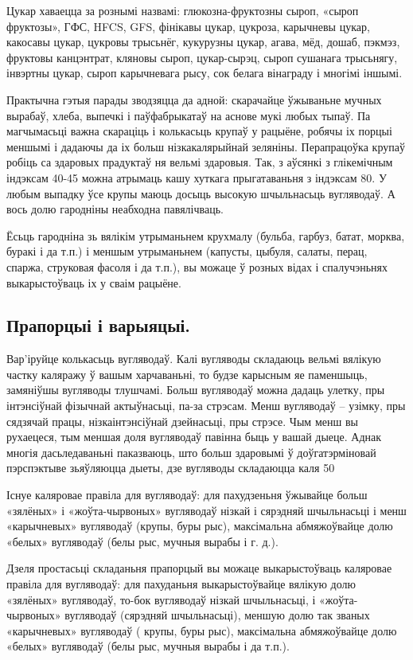 Цукар хаваецца за рознымі назвамі: глюкозна-фруктозны сыроп, «сыроп фруктозы», ГФС, HFCS, GFS, фінікавы цукар, цукроза, карычневы цукар, какосавы цукар, цукровы трысьнёг, кукурузны цукар, агава, мёд, дошаб, пэкмэз, фруктовы канцэнтрат, кляновы сыроп, цукар-сырэц, сыроп сушанага трысьнягу, інвэртны цукар, сыроп карычневага рысу, сок белага вінаграду і многімі іншымі.

Практычна гэтыя парады зводзяцца да адной: скарачайце ўжываньне мучных вырабаў, хлеба, выпечкі і паўфабрыкатаў на аснове мукі любых тыпаў. Па магчымасьці важна скараціць і колькасьць крупаў у рацыёне, робячы іх порцыі меншымі і дадаючы да іх больш нізкакалярыйнай зеляніны. Перапрацоўка крупаў робіць са здаровых прадуктаў ня вельмі здаровыя. Так, з аўсянкі з глікемічным індэксам 40-45 можна атрымаць кашу хуткага прыгатаваньня з індэксам 80. У любым выпадку ўсе крупы маюць досыць высокую шчыльнасьць вугляводаў. А вось долю гародніны неабходна павялічваць.

Ёсьць гародніна зь вялікім утрыманьнем крухмалу (бульба, гарбуз, батат, морква, буракі і да т.п.) і меншым утрыманьнем (капусты, цыбуля, салаты, перац, спаржа, струковая фасоля і да т.п.), вы можаце ў розных відах і спалучэньнях выкарыстоўваць іх у сваім рацыёне.

\subsection{Прапорцыі і варыяцыі.}
Вар'іруйце колькасьць вугляводаў. Калі вугляводы складаюць вельмі вялікую частку каляражу ў вашым харчаваньні, то будзе карысным яе паменшыць, замяніўшы вугляводы тлушчамі. Больш вугляводаў можна дадаць улетку, пры інтэнсіўнай фізычнай актыўнасьці, па-за стрэсам. Менш вугляводаў – узімку, пры сядзячай працы, нізкаінтэнсіўнай дзейнасьці, пры стрэсе. Чым менш вы рухаецеся, тым меншая доля вугляводаў павінна быць у вашай дыеце. Аднак многія дасьледаваньні паказваюць, што больш здаровымі ў доўгатэрміновай пэрспэктыве зьяўляюцца дыеты, дзе вугляводы складаюцца каля 50%

Існуе каляровае правіла для вугляводаў: для пахудзеньня ўжывайце больш «зялёных» і «жоўта-чырвоных» вугляводаў нізкай і сярэдняй шчыльнасьці і менш «карычневых» вугляводаў (крупы, буры рыс), максімальна абмяжоўвайце долю «белых» вугляводаў (белы рыс, мучныя вырабы і г. д.).

Дзеля простасьці складаньня прапорцый вы можаце выкарыстоўваць каляровае правіла для вугляводаў: для пахуданьня выкарыстоўвайце вялікую долю «зялёных» вугляводаў, то-бок вугляводаў нізкай шчыльнасьці, і «жоўта-чырвоных» вугляводаў (сярэдняй шчыльнасьці), меншую долю так званых «карычневых» вугляводаў ( крупы, буры рыс), максімальна абмяжоўвайце долю «белых» вугляводаў (белы рыс, мучныя вырабы і да т.п.).

